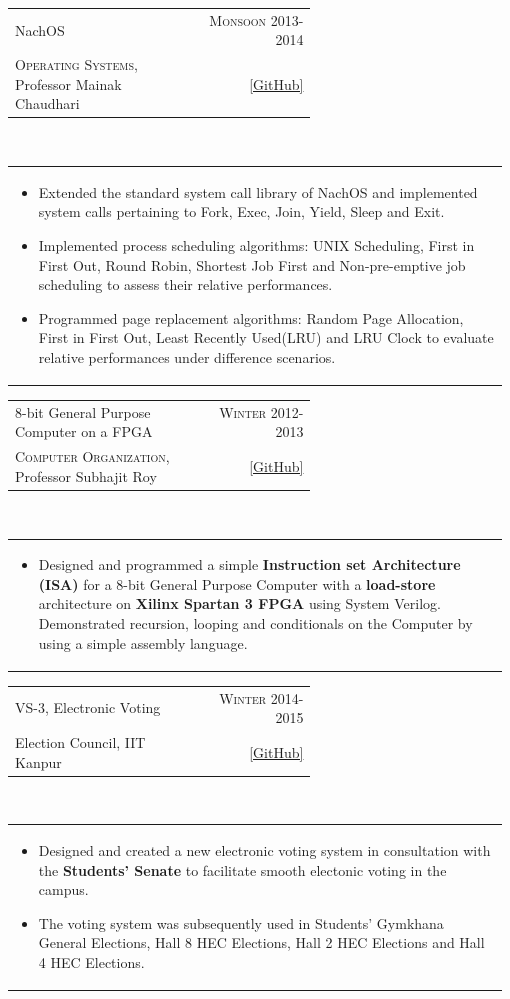 \documentclass[a4paper]{article} %
\newcommand{\verticalspacing}{-0.25cm}
\newcommand{\bulletspace}{0.7cm}
\newcommand{\projectheadspacing}{6.9cm}
\newcommand{\cproject}[5]{%
    \begin{tabular}{p{0.60\linewidth}r}
        \textcolor{NavyBlue}{\small #2} & \multicolumn{1}{m{ \projectheadspacing{} }}{\raggedleft \small {\textsc{#1}}}\\
        \small {#3} & \small {#4}
    \end{tabular}\\
    \begin{tabular}{p{0.98\linewidth}}
    \vspace{-0.3cm}
        \small{#5}
    \end{tabular}
    \vspace{\verticalspacing{}}
}
\begin{document}
\cproject
    {Monsoon 2013-2014}
    {NachOS}
    {\textsc{Operating Systems}, Professor Mainak Chaudhari}
    {\href{https://github.com/srijanshetty/nachos} {[GitHub]}}
    {%
        \begin{itemize}[leftmargin=\bulletspace{}]
            \item Extended the standard system call library of NachOS and implemented system calls pertaining to Fork, Exec,
                Join, Yield, Sleep and Exit.
            \item Implemented process scheduling algorithms: UNIX Scheduling, First in First Out,
                Round Robin, Shortest Job First and Non-pre-emptive job scheduling to assess their relative performances.
            \item Programmed page replacement algorithms: Random Page Allocation, First in First Out,
                Least Recently Used(LRU) and LRU Clock to evaluate relative performances under difference scenarios.
        \end{itemize}
    }

\cproject
    {Winter 2012-2013}
    {8-bit General Purpose Computer on a FPGA}
    {\textsc{Computer Organization}, Professor Subhajit Roy}
    {\href{https://github.com/srijanshetty/220\_y11} {[GitHub]}}
    {%
        \begin{itemize}[leftmargin=\bulletspace{}]
            \item Designed and programmed a simple \textbf{Instruction set Architecture (ISA)} for a 8-bit General
                Purpose Computer with a \textbf{load-store}
                architecture on \textbf{Xilinx Spartan 3 FPGA} using System Verilog.  Demonstrated recursion, looping
                and conditionals on the Computer by using a simple assembly language.
        \end{itemize}
    }


\cproject
    {Winter 2014-2015}
    {VS-3, Electronic Voting}
    {Election Council, IIT Kanpur}
    {\href{https://github.com/srijanshetty/elections} {\small{[GitHub]}}}
    {%
        \begin{itemize}[leftmargin=\bulletspace{}]
            \item Designed and created a new electronic voting system in consultation with the \textbf{Students' Senate}
                to facilitate smooth electonic voting in the campus.
            \item The voting system was subsequently used in Students'
                Gymkhana General Elections, Hall 8 HEC Elections, Hall 2 HEC Elections and Hall 4 HEC Elections.
        \end{itemize}
    }
\end{document}
